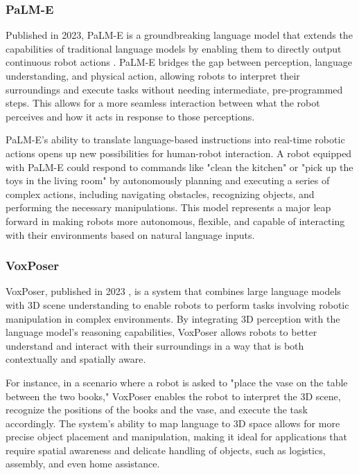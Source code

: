 \subsubsection{PaLM-E}

Published in 2023, PaLM-E is a groundbreaking language model that extends the capabilities of traditional language models by enabling them to directly output continuous robot actions \cite{driess2023palm}. 
PaLM-E bridges the gap between perception, language understanding, and physical action, allowing robots to interpret their surroundings and execute tasks without needing intermediate, pre-programmed steps. 
This allows for a more seamless interaction between what the robot perceives and how it acts in response to those perceptions.

PaLM-E's ability to translate language-based instructions into real-time robotic actions opens up new possibilities for human-robot interaction. 
A robot equipped with PaLM-E could respond to commands like "clean the kitchen" or "pick up the toys in the living room" by autonomously planning and executing a series of complex actions, including navigating obstacles, recognizing objects, and performing the necessary manipulations. 
This model represents a major leap forward in making robots more autonomous, flexible, and capable of interacting with their environments based on natural language inputs.

\subsubsection{VoxPoser}

VoxPoser, published in 2023 \cite{liu2023voxposer}, is a system that combines large language models with 3D scene understanding to enable robots to perform tasks involving robotic manipulation in complex environments. 
By integrating 3D perception with the language model's reasoning capabilities, VoxPoser allows robots to better understand and interact with their surroundings in a way that is both contextually and spatially aware.

For instance, in a scenario where a robot is asked to "place the vase on the table between the two books," VoxPoser enables the robot to interpret the 3D scene, recognize the positions of the books and the vase, and execute the task accordingly. 
The system's ability to map language to 3D space allows for more precise object placement and manipulation, making it ideal for applications that require spatial awareness and delicate handling of objects, such as logistics, assembly, and even home assistance.

